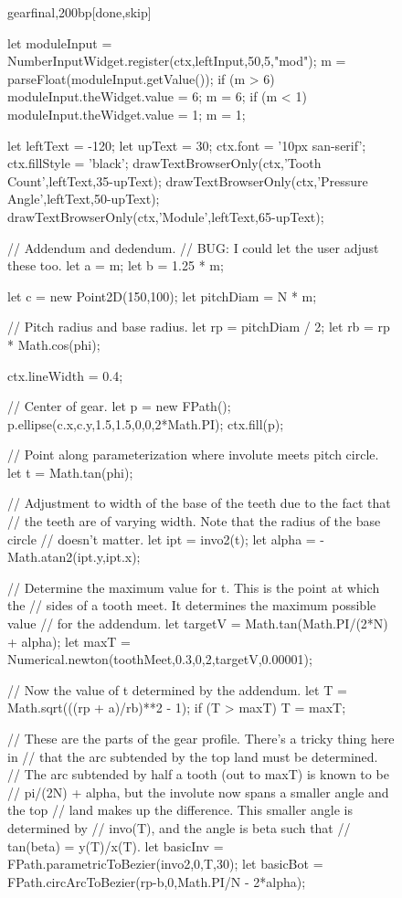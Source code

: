 \documentclass[10pt]{article}
\begin{document}
{\begin{figure}
\begin{figput}{gearfinal,200bp}[done,skip]
{  let moduleInput = NumberInputWidget.register(ctx,leftInput,50,5,"mod");
  m = parseFloat(moduleInput.getValue());
  if (m > 6)
    {
      moduleInput.theWidget.value = 6;
      m = 6;
    }
  if (m < 1)
    {
      moduleInput.theWidget.value = 1;
      m = 1;
    }

  let leftText = -120;
  let upText = 30;
  ctx.font = '10px san-serif';
  ctx.fillStyle = 'black';
  drawTextBrowserOnly(ctx,'Tooth Count',leftText,35-upText);
  drawTextBrowserOnly(ctx,'Pressure Angle',leftText,50-upText);
  drawTextBrowserOnly(ctx,'Module',leftText,65-upText);
  
  // Addendum and dedendum.
  // BUG: I could let the user adjust these too.
  let a = m;
  let b = 1.25 * m;
  
  let c = new Point2D(150,100);
  let pitchDiam = N * m;

  // Pitch radius and base radius.
  let rp = pitchDiam / 2;
  let rb = rp * Math.cos(phi);

  ctx.lineWidth = 0.4;

  // Center of gear.
  let p = new FPath();
  p.ellipse(c.x,c.y,1.5,1.5,0,0,2*Math.PI);
  ctx.fill(p);

  // Point along parameterization where involute meets pitch circle.
  let t = Math.tan(phi);

  // Adjustment to width of the base of the teeth due to the fact that
  // the teeth are of varying width. Note that the radius of the base circle
  // doesn't matter.
  let ipt = invo2(t);
  let alpha = -Math.atan2(ipt.y,ipt.x);

  // Determine the maximum value for t. This is the point at which the
  // sides of a tooth meet. It determines the maximum possible value
  // for the addendum.
  let targetV = Math.tan(Math.PI/(2*N) + alpha);
  let maxT = Numerical.newton(toothMeet,0.3,0,2,targetV,0.00001);

  // Now the value of t determined by the addendum.
  let T = Math.sqrt(((rp + a)/rb)**2 - 1);
  if (T > maxT)
    T = maxT;

  // These are the parts of the gear profile. There's a tricky thing here in
  // that the arc subtended by the top land must be determined.
  // The arc subtended by half a tooth (out to maxT) is known to be
  // pi/(2N) + alpha, but the involute now spans a smaller angle and the top
  // land makes up the difference. This smaller angle is determined by
  // invo(T), and the angle is beta such that
  // tan(beta) = y(T)/x(T).
  let basicInv = FPath.parametricToBezier(invo2,0,T,30);
  let basicBot = FPath.circArcToBezier(rp-b,0,Math.PI/N - 2*alpha);

}
\end{figput}
\end{figure}}
\end{document}

